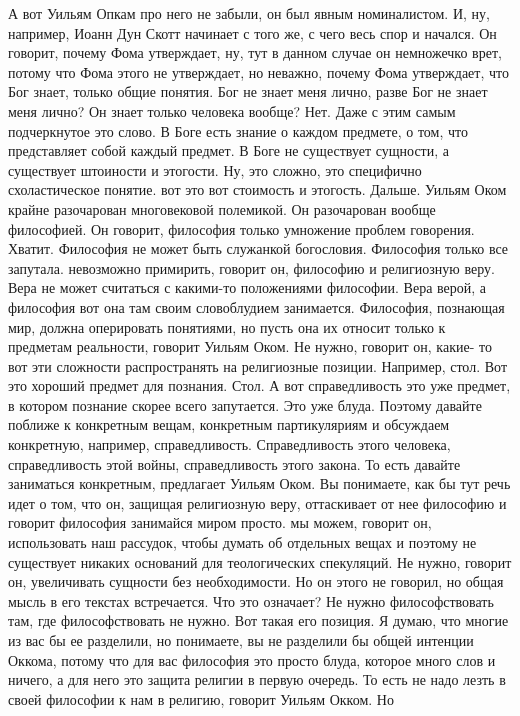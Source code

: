 А вот Уильям Опкам про него не забыли, он был
явным номиналистом. И, ну, например, Иоанн Дун Скотт начинает с того же, с чего
весь спор и начался. Он говорит, почему Фома утверждает, ну, тут в данном случае
он немножечко врет, потому что Фома этого не утверждает, но неважно, почему Фома
утверждает, что Бог знает, только общие понятия. Бог не знает меня лично, разве
Бог не знает меня лично? Он знает только человека вообще? Нет. Даже с этим самым
подчеркнутое это слово. В Боге есть знание о каждом предмете, о том, что
представляет собой каждый предмет. В Боге не существует сущности, а существует
штоиности и этогости. Ну, это сложно, это специфично схоластическое понятие. вот
это вот стоимость и этогость. Дальше. Уильям Оком крайне разочарован
многовековой полемикой. Он разочарован вообще философией. Он говорит, философия
только умножение проблем говорения. Хватит. Философия не может быть служанкой
богословия. Философия только все запутала. невозможно примирить, говорит он,
философию и религиозную веру. Вера не может считаться с какими-то положениями
философии. Вера верой, а философия вот она там своим словоблудием занимается.
Философия, познающая мир, должна оперировать понятиями, но пусть она их относит
только к предметам реальности, говорит Уильям Оком. Не нужно, говорит он, какие-
то вот эти сложности распространять на религиозные позиции. Например, стол. Вот
это хороший предмет для познания. Стол. А вот справедливость это уже предмет, в
котором познание скорее всего запутается. Это уже блуда. Поэтому давайте поближе
к конкретным вещам, конкретным партикуляриям и обсуждаем конкретную, например,
справедливость. Справедливость этого человека, справедливость этой войны,
справедливость этого закона. То есть давайте заниматься конкретным, предлагает
Уильям Оком. Вы понимаете, как бы тут речь идет о том, что он, защищая
религиозную веру, оттаскивает от нее философию и говорит философия занимайся
миром просто. мы можем, говорит он, использовать наш рассудок, чтобы думать об
отдельных вещах и поэтому не существует никаких оснований для теологических
спекуляций. Не нужно, говорит он, увеличивать сущности без необходимости. Но он
этого не говорил, но общая мысль в его текстах встречается. Что это означает? Не
нужно философствовать там, где философствовать не нужно. Вот такая его позиция.
Я думаю, что многие из вас бы ее разделили, но понимаете, вы не разделили бы
общей интенции Оккома, потому что для вас философия это просто блуда, которое
много слов и ничего, а для него это защита религии в первую очередь. То есть не
надо лезть в своей философии к нам в религию, говорит Уильям Окком. Но

